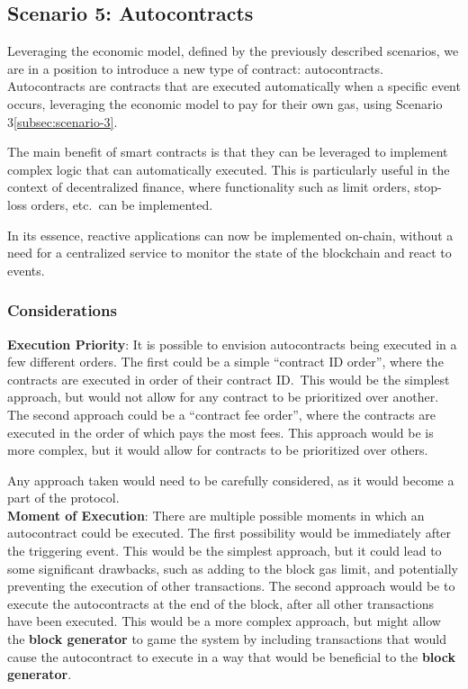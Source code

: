 \documentclass[twocolumn, nofootinbib]{revtex4-2} %
\newcommand{\emphasize}[1]{\textbf{#1}\xspace}
\newcommand{\blockgenerator}{\emphasize{block generator}}
\begin{document}
    \subsection*{Scenario 5: Autocontracts}\label{subsec:scenario-5}

    Leveraging the economic model, defined by the previously described scenarios,
    we are in a position to introduce a new type of contract: autocontracts.
    Autocontracts are contracts that are executed automatically when a specific
    event occurs, leveraging the economic model to pay for their own gas, using
    Scenario 3\ref{subsec:scenario-3}.

    The main benefit of smart contracts is that they can be leveraged to implement
    complex logic that can automatically executed.
    This is particularly useful in the context of decentralized finance, where
    functionality such as limit orders, stop-loss orders, etc.\ can be implemented.

    In its essence, reactive applications can now be implemented on-chain, without
    a need for a centralized service to monitor the state of the blockchain and
    react to events.

    \subsubsection*{Considerations}\label{subsubsec:considerations}

    \textbf{Execution Priority}: It is possible to envision autocontracts being
    executed in a few different orders.
    The first could be a simple ``contract ID order'', where the contracts are
    executed in order of their contract ID.\
    This would be the simplest approach, but would not allow for any contract
    to be prioritized over another.
    The second approach could be a ``contract fee order'', where the contracts
    are executed in the order of which pays the most fees.
    This approach would be is more complex, but it would allow for contracts
    to be prioritized over others.

    Any approach taken would need to be carefully considered, as it would
    become a part of the protocol.\\

    \textbf{Moment of Execution}: There are multiple possible moments in which an
    autocontract could be executed.
    The first possibility would be immediately after the triggering event.
    This would be the simplest approach, but it could lead to some significant
    drawbacks, such as adding to the block gas limit, and potentially preventing the
    execution of other transactions.
    The second approach would be to execute the autocontracts at the end of the
    block, after all other transactions have been executed.
    This would be a more complex approach, but might allow the \blockgenerator to
    game the system by including transactions that would cause the autocontract to
    execute in a way that would be beneficial to the \blockgenerator.
\end{document}
